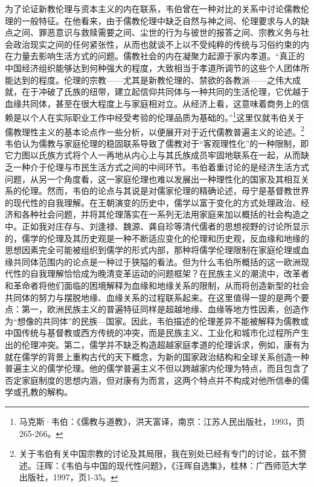 \documentclass[a4paper, 12pt, openright]{ctexbook}
\begin{document}
为了论证新教伦理与资本主义的内在联系，韦伯曾在一种对比的关系中讨论儒教伦理的一般特征。在他看来，由于儒教伦理中缺乏自然与神之间、伦理要求与人的缺点之间、罪恶意识与救赎需要之间、尘世的行为与彼世的报答之间、宗教义务与社会政治现实之间的任何紧张性，从而也就谈不上以不受纯粹的传统与习俗约束的内在力量去影响生活方式的问题。儒教社会的内在凝聚力起源于家内孝道。“真正的中国经济组织能够达到何种强大的程度，大致相当于孝道所调节的这些个人团体所能达到的程度。伦理的宗教——尤其是新教伦理的、禁欲的各教派——之伟大成就，在于冲破了氏族的纽带，建立起信仰共同体与一种共同的生活伦理，它优越于血缘共同体，甚至在很大程度上与家庭相对立。从经济上看，这意味着商务上的信赖是以个人在实际职业工作中经受考验的伦理品质为基础的。”\footnote{马克斯·韦伯：《儒教与道教》，洪天富译，南京：江苏人民出版社，1993，页265-266。}这里仅就韦伯关于儒教理性主义的基本论点作一些分析，以便展开对于近代儒教普遍主义的论述。\footnote{关于韦伯有关中国宗教的讨论及其局限，我在别处已经有专门的讨论，兹不赘述。汪晖：《韦伯与中国的现代性问题》，《汪晖自选集》，桂林：广西师范大学出版社，1997，页1-35。}韦伯认为儒教与家庭伦理的稳固联系导致了儒教对于“客观理性化”的一种限制，即它力图以氏族方式将个人一再地从内心上与其氏族成员牢固地联系在一起，从而缺乏一种介于伦理与市民生活方式之间的中间环节。韦伯着重讨论的是经济生活方式问题，从另一个角度看，这一家庭伦理也难以发展出一种理性化的国家及其相互关系的伦理。然而，韦伯的论点与其说是对儒家伦理的精确论述，毋宁是基督教世界的现代性的自我理解。在王朝演变的历史中，儒学以富于变化的方式处理政治、经济和各种社会问题，并将其伦理落实在一系列无法用家庭来加以概括的社会构造之中。正如我对庄存与、刘逢禄、魏源、龚自珍等清代儒者的思想视野的讨论所显示的，儒学的伦理及其历史观是一种不断适应变化的伦理和历史观，反血缘和地缘的思想因素完全可能被组织到儒学的形式内部，那种将儒学伦理限制在家庭伦理或血缘共同体范围内的论点是一种过于狭隘的看法。但为什么韦伯所概括的这一欧洲现代性的自我理解恰恰成为晚清变革运动的问题框架？在民族主义的潮流中，改革者和革命者将他们面临的困境解释为血缘和地缘关系的限制，从而将创造新型的社会共同体的努力与摆脱地缘、血缘关系的过程联系起来。在这里值得一提的是两个要点：第一，欧洲民族主义的普遍特征同样是超越地缘、血缘等地方性因素，创造作为“想像的共同体”的民族—国家。因此，韦伯描述的伦理差异不能被解释为儒教或中国传统与基督教或西方传统的冲突，而是民族主义、工业化和城市化过程所产生出的伦理冲突。第二，儒学并不缺乏构造超越家庭孝道的伦理诉求，例如，康有为就在儒学的背景上重构古代的天下概念，为新的国家政治结构和全球关系创造一种普遍主义的儒学伦理。他的儒学普遍主义不但以跨越家内伦理为特点，而且包含了否定家庭制度的思想内涵，但对康有为而言，这两个特点并不构成对他所信奉的儒学或孔教的解构。
\end{document}
